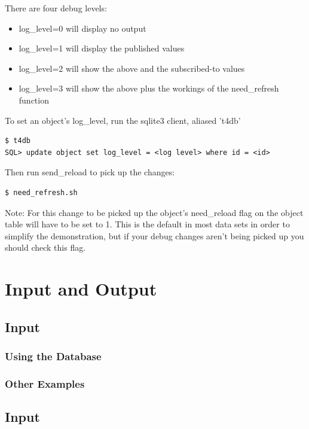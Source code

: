\documentclass{report}
\begin{document}
There are four debug levels:

\begin{itemize}
\item log_level=0 will display no output
\item log_level=1 will display the published values
\item log_level=2 will show the above and the subscribed-to values
\item log_level=3 will show the above plus the workings of the need_refresh function
\end{itemize}

To set an object's log_level, run the sqlite3 client, aliased 't4db'

\begin{verbatim}
$ t4db
SQL> update object set log_level = <log level> where id = <id>
\end{verbatim}

Then run send_reload to pick up the changes:

\begin{verbatim}
$ need_refresh.sh
\end{verbatim}

Note: For this change to be picked up the object's need_reload flag on the object table will have to be set to 1. This is the default in most data sets in order to simplify the demonstration, but if your debug changes aren't being picked up you should check this flag.

\section{Input and Output}

\subsection{Input}

\subsubsection{Using the Database}

\subsubsection{Other Examples}

\subsection{Input}
\end{document}

